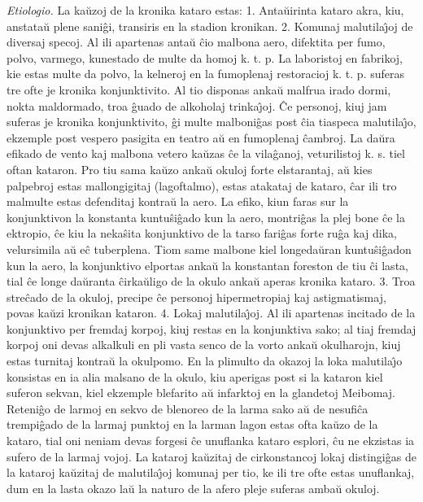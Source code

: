 {\sl Etiologio.} La ka\u uzoj de la kronika kataro estas: 1. Anta\u
uirinta kataro akra, kiu, anstata\u u plene sani\^gi, transiris en
la stadion kronikan. 2. Komunaj malutila\^{\j}oj de diversaj specoj.
Al ili apartenas anta\u u \^cio malbona aero, difektita per fumo,
polvo, varmego, kunestado de multe da homoj k. t. p. La laboristoj
en fabrikoj, kie estas multe da polvo, la kelneroj en la fumoplenaj
restoracioj k. t. p. suferas tre ofte je kronika konjunktivito. Al
tio disponas anka\u u malfrua irado dormi, nokta maldormado, troa
\^guado de alkoholaj trinka\^{\j}oj. \^Ce personoj, kiuj jam suferas
je kronika konjunktivito, \^gi multe malboni\^gas post \^cia
tiaspeca malutila\^{\j}o, ekzemple post vespero pasigita en teatro
a\u u en fumoplenaj \^cambroj. La da\u ura efikado de vento kaj
malbona vetero ka\u uzas \^ce la vila\^ganoj, veturilistoj k. s.
tiel oftan kataron. Pro tiu sama ka\u uzo anka\u u okuloj forte
elstarantaj, a\u u kies palpebroj estas mallongigitaj (lagoftalmo),
estas atakataj de kataro, \^car ili tro malmulte estas defenditaj
kontra\u u la aero. La efiko, kiun faras sur la konjunktivon la
konstanta kuntu\^si\^gado kun la aero, montri\^gas la plej bone \^ce
la ektropio, \^ce kiu la neka\^sita konjunktivo de la tarso
fari\^gas forte ru\^ga kaj dika, velursimila a\u u e\^c tuberplena.
Tiom same malbone kiel longeda\u uran kuntu\^si\^gadon kun la aero,
la konjunktivo elportas anka\u u la konstantan foreston de tiu \^ci
lasta, tial \^ce longe da\u uranta \^cirka\u uligo de la okulo
anka\u u aperas kronika kataro. 3. Troa stre\^cado de la okuloj,
precipe \^ce personoj hipermetropiaj kaj astigmatismaj, povas ka\u
uzi kronikan kataron. 4. Lokaj malutila\^{\j}oj. Al ili apartenas
incitado de la konjunktivo per fremdaj korpoj, kiuj restas en la
konjunktiva sako; al tiaj fremdaj korpoj oni devas alkalkuli en pli
vasta senco de la vorto anka\u u okulharojn, kiuj estas turnitaj
kontra\u u la okulpomo. En la plimulto da okazoj la loka
malutila\^{\j}o konsistas en ia alia malsano de la okulo, kiu
aperigas post si la kataron kiel suferon sekvan, kiel ekzemple
blefarito a\u u infarktoj en la glandetoj Meibomaj. Reteni\^go de
larmoj en sekvo de blenoreo de la larma sako a\u u de nesufi\^ca
trempi\^gado de la larmaj punktoj en la larman lagon estas ofta ka\u
uzo de la kataro, tial oni neniam devas forgesi \^ce unuflanka
kataro esplori, \^cu ne ekzistas ia sufero de la larmaj vojoj. La
kataroj ka\u uzitaj de cirkonstancoj lokaj distingi\^gas de la
kataroj ka\u uzitaj de malutila\^{\j}oj komunaj per tio, ke ili tre
ofte estas unuflankaj, dum en la lasta okazo la\u u la naturo de la
afero pleje suferas amba\u u okuloj.

